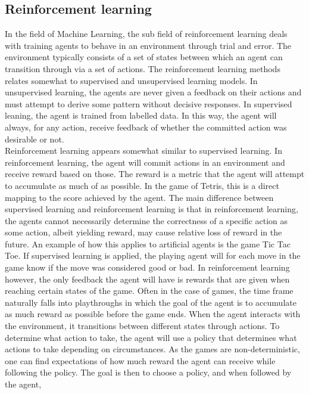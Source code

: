 \subsection{Reinforcement learning \label{RL}}

In the field of Machine Learning, the sub field of reinforcement learning
deals with training agents to behave in an environment through
trial and error. The environment typically consists of a set of states
between which an agent can transition through via a set of actions.
The reinforcement learning methods relates somewhat 
to supervised and unsupervised learning models. In unsupervised 
learning, the agents are never given a feedback on their actions
and must attempt to derive some pattern without decisive responses.
In supervised leaning, the agent is trained from labelled data.
In this way, the agent will always, for any action, receive 
feedback of whether the committed action was desirable or not.\\
Reinforcement learning appears somewhat similar to supervised learning.
In reinforcement learning, the agent will commit actions in an environment
and receive reward based on those. The reward is a metric that the agent 
will attempt to accumulate
as much of as possible. In the game of Tetris, this is a direct mapping to 
the score achieved by the agent.
 The main difference between supervised
learning and reinforcement learning is that in reinforcement learning,
the agents cannot necessarily determine the correctness 
of a specific action as some action, albeit yielding reward,
may cause relative loss of reward in the future. An example of how this applies 
to artificial agents is the game Tic Tac Toe. If supervised learning
is applied, the playing agent will for each move in the game know
if the move was considered good or bad. In reinforcement learning however,
the only feedback the agent will have is rewards that are given 
when reaching certain states of the game. 
Often in the case of games, the 
time frame naturally falls into playthroughs in which the 
goal of the agent is to accumulate as much reward as possible 
before the game ends. When the agent interacts 
with the environment, it transitions between different states through 
actions. To determine what action to take, the agent will use
a policy that determines what actions to take depending on circumstances.
As the games are non-deterministic, one can find expectations
of how much reward the agent can receive while following the policy. 
The goal is then to choose a policy, and when followed by the agent,
